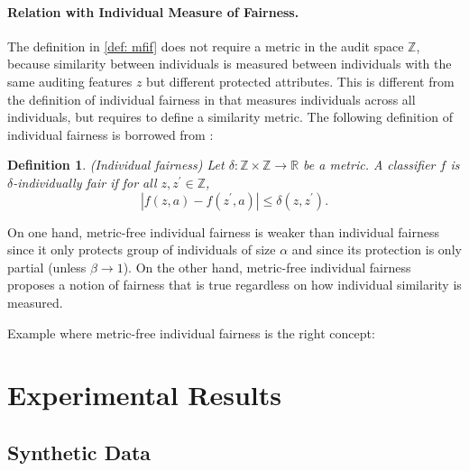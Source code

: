 \documentclass{article}
\newtheorem{defn}{Definition}[section]
\begin{document}
\paragraph{Relation with Individual Measure of Fairness.}
The definition in \ref{def: mfif} does not require a metric in the audit space $\mathbb{Z}$, because similarity between individuals is measured between individuals with the same auditing features $z$ but different protected attributes. This is different from the definition of individual fairness in \cite{dwork2012fairness} that measures individuals across all individuals, but requires to define a similarity metric. The following definition of individual fairness is borrowed from \cite{dwork2012fairness}:

\begin{defn}(Individual fairness)
Let $\delta:\mathbb{Z} \times \mathbb{Z} \rightarrow \mathbb{R}$ be a metric. A classifier $f$ is $\delta$-individually fair if for all $z, z^{'} \in \mathbb{Z}$, 
$$|f(z, a) - f(z^{'}, a)| \leq \delta(z, z^{'}).$$
\end{defn}

On one hand, metric-free individual fairness is weaker than individual fairness since it only protects group of individuals of size $\alpha$ and since its protection is only partial (unless $\beta \rightarrow 1$). On the other hand, metric-free individual fairness proposes a notion of fairness that is true regardless on how individual similarity is measured. 

\bigskip
Example where metric-free individual fairness is the right concept: 




\section{Experimental Results}
\subsection{Synthetic Data}
\end{document}

